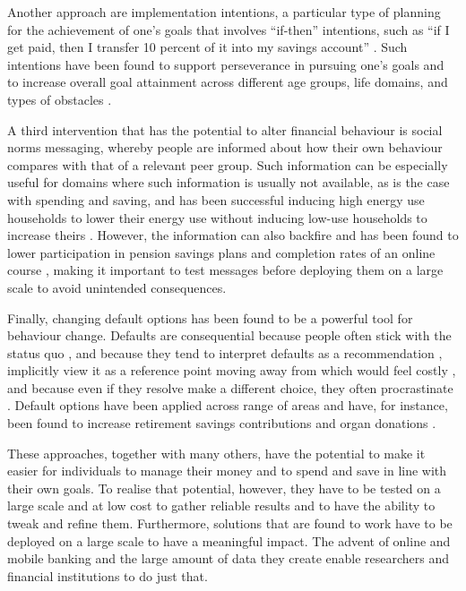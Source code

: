 Another approach are implementation intentions, a particular type of planning
for the achievement of one's goals that involves ``if-then'' intentions, such as
``if I get paid, then I transfer 10 percent of it into my savings account''
\citep{gollwitzer2006implementation, rogers2015beyond}. Such intentions have
been found to support perseverance in pursuing one's goals
\citep{oettingen2010strategies} and to increase overall goal attainment across
different age groups, life domains, and types of obstacles
\citep{gollwitzer2006implementation}.

A third intervention that has the potential to alter financial behaviour is
social norms messaging, whereby people are informed about how their own
behaviour compares with that of a relevant peer group. Such information can be
especially useful for domains where such information is usually not available,
as is the case with spending and saving, and has been successful inducing high
energy use households to lower their energy use without inducing low-use
households to increase theirs \citep{schultz2007constructive,
allcott2011social, allcott2014short, brandon2017effects}. However, the
information can also backfire and has been found to lower participation in
pension savings plans \citep{beshears2015effect} and completion rates of an
online course \citep{rogers2016discouraged}, making it important to test
messages before deploying them on a large scale to avoid unintended
consequences.

Finally, changing default options has been found to be a powerful tool for
behaviour change. Defaults are consequential because people often stick
with the status quo \citep{samuelson1988status}, and because they tend to
interpret defaults as a recommendation \citep{mckenzie2006recommendations},
implicitly view it as a reference point moving away from which would feel
costly \citep{johnson2003defaults, kahneman1979prospect}, and because even if
they resolve make a different choice, they often procrastinate
\citep{carroll2009optimal, ericson2017interaction}. Default options have been
applied across range of areas and have, for instance, been found to increase
retirement savings contributions \citep{madrian2001power,
beshears2009importance} and organ donations \citep{johnson2003defaults,
gimbel2003presumed, abadie2006impact}.

These approaches, together with many others, have the potential to make it
easier for individuals to manage their money and to spend and save in line with
their own goals. To realise that potential, however, they have to be tested on
a large scale and at low cost to gather reliable results and to have the
ability to tweak and refine them. Furthermore, solutions that are found to work
have to be deployed on a large scale to have a meaningful impact. The advent of
online and mobile banking and the large amount of data they create enable
researchers and financial institutions to do just that.


